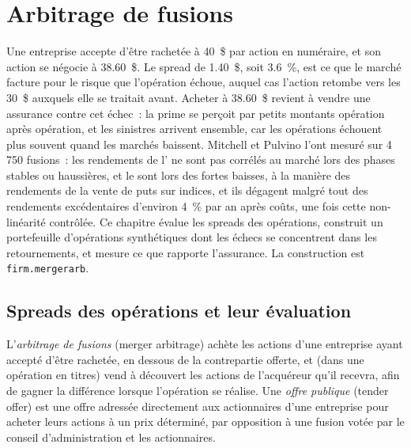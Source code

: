 \chapter{Arbitrage de fusions}\label{ch:s1:merger-arbitrage}

Une entreprise accepte d'être rachetée à 40~\$ par action en numéraire, et son action se négocie à 38.60~\$. Le spread de 1.40~\$, soit 3.6~\%, est ce que le marché facture pour le risque
que l'opération échoue, auquel cas l'action retombe vers les 30~\$ auxquels elle se traitait avant. Acheter à 38.60~\$ revient à vendre une assurance contre cet échec~:
la prime se perçoit par petits montants opération après opération, et les sinistres arrivent ensemble, car les opérations échouent plus souvent quand les marchés baissent. Mitchell et
Pulvino l'ont mesuré sur 4\,750 fusions~: les rendements de l' ne sont pas corrélés au marché lors des phases stables ou haussières, et le sont
lors des fortes baisses, à la manière des rendements de la vente de puts sur indices, et ils dégagent malgré tout des rendements excédentaires d'environ 4~\% par an après coûts, une fois cette non-linéarité contrôlée. Ce chapitre évalue
les spreads des opérations, construit un portefeuille d'opérations synthétiques dont les échecs se concentrent dans les retournements, et mesure ce que rapporte l'assurance. La construction est
\texttt{firm.mergerarb}.

\section{Spreads des opérations et leur évaluation}

\begin{definition}\label{def:s1:merger-arbitrage:arb}
L'\emph{arbitrage de fusions} (merger arbitrage) achète les actions d'une entreprise ayant accepté d'être rachetée, en dessous de la contrepartie offerte, et (dans une
opération en titres) vend à découvert les actions de l'acquéreur qu'il recevra, afin de gagner la différence lorsque l'opération se réalise. Une \emph{offre publique} (tender offer) est
une offre adressée directement aux actionnaires d'une entreprise pour acheter leurs actions à un prix déterminé, par opposition à une fusion votée par le conseil d'administration et les actionnaires.
\end{definition}

